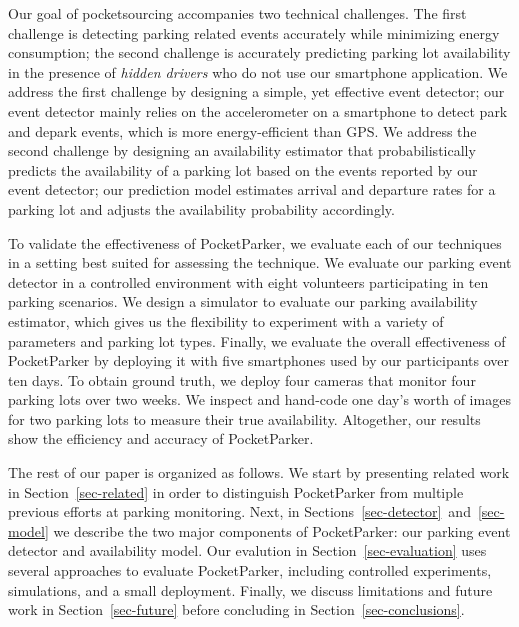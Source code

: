Our goal of pocketsourcing accompanies two technical challenges. The first
challenge is detecting parking related events accurately while minimizing energy
consumption; the second challenge is accurately predicting parking lot
availability in the presence of {\it hidden drivers} who do not use our
smartphone application. We address the first challenge by designing a simple,
yet effective event detector; our event detector mainly relies on the
accelerometer on a smartphone to detect park and depark events, which is more
energy-efficient than GPS. We address the second challenge by designing an
availability estimator that probabilistically predicts the availability of a
parking lot based on the events reported by our event detector; our prediction
model estimates arrival and departure rates for a parking lot and adjusts the
availability probability accordingly.

To validate the effectiveness of PocketParker, we evaluate each of our
techniques in a setting best suited for assessing the technique. We evaluate
our parking event detector in a controlled environment with eight volunteers
participating in ten parking scenarios. We design a simulator to evaluate our
parking availability estimator, which gives us the flexibility to experiment
with a variety of parameters and parking lot types. Finally, we evaluate the
overall effectiveness of PocketParker by deploying it with five smartphones used
by our participants over ten days. To obtain ground truth, we deploy four
cameras that monitor four parking lots over two weeks. We inspect and hand-code
one day's worth of images for two parking lots to measure their true
availability. Altogether, our results show the efficiency and accuracy of
PocketParker.

The rest of our paper is organized as follows. We start by presenting related
work in Section~\ref{sec-related} in order to distinguish PocketParker from
multiple previous efforts at parking monitoring. Next, in
Sections~\ref{sec-detector}~and~\ref{sec-model} we describe the two major
components of PocketParker: our parking event detector and availability
model. Our evalution in Section~\ref{sec-evaluation} uses several approaches
to evaluate PocketParker, including controlled experiments, simulations, and
a small deployment. Finally, we discuss limitations and future work in
Section~\ref{sec-future} before concluding in Section~\ref{sec-conclusions}.

